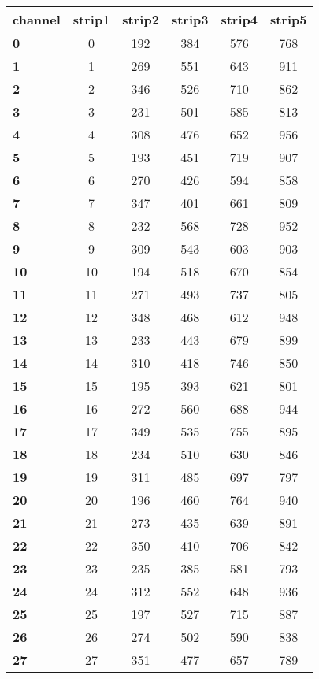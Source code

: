   \begin{longtable}{|l|c|c|c|c|c|}
    \hline
    \textbf{channel} & strip1 &strip2 & strip3 & strip4 & strip5 \\
    \hline 
    \textbf{0} & 0 &192 & 384 & 576 & 768 \\
    \textbf{1} & 1 &269 & 551 & 643 & 911 \\
    \textbf{2} & 2 &346 & 526 & 710 & 862 \\
    \textbf{3} & 3 &231 & 501 & 585 & 813 \\
    \textbf{4} & 4 &308 & 476 & 652 & 956 \\
    \textbf{5} & 5 &193 & 451 & 719 & 907 \\
    \textbf{6} & 6 &270 & 426 & 594 & 858 \\
    \textbf{7} & 7 &347 & 401 & 661 & 809 \\
    \textbf{8} & 8 &232 & 568 & 728 & 952 \\
    \textbf{9} & 9 &309 & 543 & 603 & 903 \\
    \textbf{10} & 10 &194 & 518 & 670 & 854 \\
    \textbf{11} & 11 &271 & 493 & 737 & 805 \\
    \textbf{12} & 12 &348 & 468 & 612 & 948 \\
    \textbf{13} & 13 &233 & 443 & 679 & 899 \\
    \textbf{14} & 14 &310 & 418 & 746 & 850 \\
    \textbf{15} & 15 &195 & 393 & 621 & 801 \\
    \textbf{16} & 16 &272 & 560 & 688 & 944 \\
    \textbf{17} & 17 &349 & 535 & 755 & 895 \\
    \textbf{18} & 18 &234 & 510 & 630 & 846 \\
    \textbf{19} & 19 &311 & 485 & 697 & 797 \\
    \textbf{20} & 20 &196 & 460 & 764 & 940 \\
    \textbf{21} & 21 &273 & 435 & 639 & 891 \\
    \textbf{22} & 22 &350 & 410 & 706 & 842 \\
    \textbf{23} & 23 &235 & 385 & 581 & 793 \\
    \textbf{24} & 24 &312 & 552 & 648 & 936 \\
    \textbf{25} & 25 &197 & 527 & 715 & 887 \\
    \textbf{26} & 26 &274 & 502 & 590 & 838 \\
    \textbf{27} & 27 &351 & 477 & 657 & 789 \\

\end{longtable}

